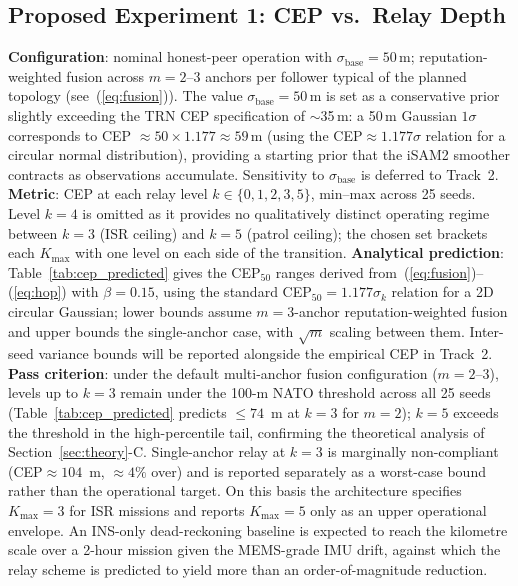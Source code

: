 \documentclass[conference,10pt]{IEEEtran}
\begin{document}
\subsection{Proposed Experiment 1: CEP vs.\ Relay Depth}

\textbf{Configuration}: nominal honest-peer operation with $\sigma_\text{base}=50$\,m; reputation-weighted fusion across $m = 2$--$3$ anchors per follower typical of the planned topology (see~(\ref{eq:fusion})). The value $\sigma_\text{base}=50$\,m is set as a conservative prior slightly exceeding the TRN CEP specification of $\sim$35\,m: a 50\,m Gaussian $1\sigma$ corresponds to CEP $\approx 50 \times 1.177 \approx 59$\,m (using the CEP$\approx 1.177\sigma$ relation for a circular normal distribution), providing a starting prior that the iSAM2 smoother contracts as observations accumulate. Sensitivity to $\sigma_\text{base}$ is deferred to Track~2.
\textbf{Metric}: CEP at each relay level $k \in \{0,1,2,3,5\}$, min--max across 25 seeds. Level $k=4$ is omitted as it provides no qualitatively distinct operating regime between $k=3$ (ISR ceiling) and $k=5$ (patrol ceiling); the chosen set brackets each $K_\text{max}$ with one level on each side of the transition.
\textbf{Analytical prediction}: Table~\ref{tab:cep_predicted} gives the CEP$_{50}$ ranges derived from~(\ref{eq:fusion})--(\ref{eq:hop}) with $\beta=0.15$, using the standard CEP$_{50}=1.177\sigma_k$ relation for a 2D circular Gaussian; lower bounds assume $m=3$-anchor reputation-weighted fusion and upper bounds the single-anchor case, with $\sqrt{m}$ scaling between them. Inter-seed variance bounds will be reported alongside the empirical CEP in Track~2.
\textbf{Pass criterion}: under the default multi-anchor fusion configuration ($m=2$--$3$), levels up to $k{=}3$ remain under the 100-m NATO threshold across all 25 seeds (Table~\ref{tab:cep_predicted} predicts $\leq 74$~m at $k=3$ for $m=2$); $k{=}5$ exceeds the threshold in the high-percentile tail, confirming the theoretical analysis of Section~\ref{sec:theory}-C. Single-anchor relay at $k=3$ is marginally non-compliant (CEP$\approx 104$~m, $\approx 4\%$ over) and is reported separately as a worst-case bound rather than the operational target. On this basis the architecture specifies $K_\text{max}{=}3$ for ISR missions and reports $K_\text{max}{=}5$ only as an upper operational envelope. An INS-only dead-reckoning baseline is expected to reach the kilometre scale over a 2-hour mission given the MEMS-grade IMU drift, against which the relay scheme is predicted to yield more than an order-of-magnitude reduction.
\end{document}
